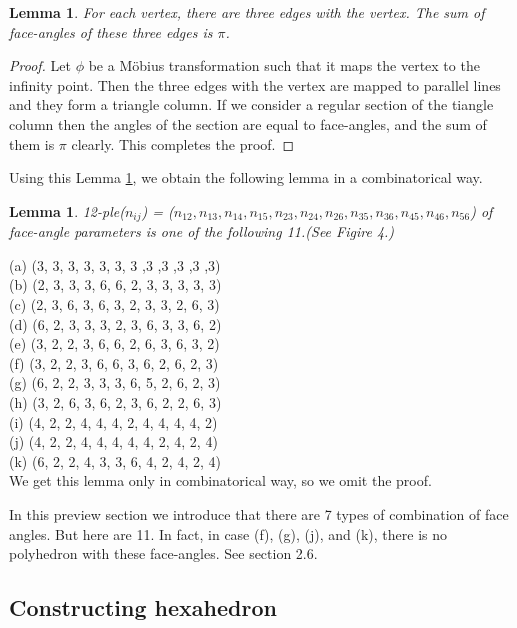 \documentclass[dvipdfmx]{interact}
\theoremstyle{plain}%
\newtheorem{lemma}[theorem]{Lemma}
\theoremstyle{definition}
\theoremstyle{remark}
\theoremstyle{problemstyle}
\begin{document}
\begin{lemma}\label{sum}
 For each vertex, there are three edges with the vertex. The sum of
 face-angles of these three edges is $\pi$.
\end{lemma}

\begin{proof}
 Let $\phi$ be a M\"obius transformation such that it maps the vertex to
 the infinity point. Then the three edges with the vertex are mapped to
 parallel lines and they form a triangle column. If we consider a
 regular section of the tiangle column then the angles of the section
 are equal to face-angles, and the sum of them is $\pi$ clearly. This
 completes the proof.
\end{proof}

 Using this Lemma \ref{sum}, we obtain the following lemma in a combinatorical way.

\begin{lemma}
 12-ple($n_{ij}$) = ($n_{12}, n_{13}, n_{14}, n_{15}, n_{23}, n_{24},
 n_{26}, n_{35}, n_{36}, n_{45}, n_{46}, n_{56}$) of face-angle
 parameters is one of the following 11.(See Figire 4.)
\end{lemma}

\noindent
(a) (3, 3, 3, 3, 3, 3, 3 ,3 ,3 ,3 ,3 ,3)\\
(b) (2, 3, 3, 3, 6, 6, 2, 3, 3, 3, 3, 3)\\
(c) (2, 3, 6, 3, 6, 3, 2, 3, 3, 2, 6, 3)\\
(d) (6, 2, 3, 3, 3, 2, 3, 6, 3, 3, 6, 2)\\
(e) (3, 2, 2, 3, 6, 6, 2, 6, 3, 6, 3, 2)\\
(f) (3, 2, 2, 3, 6, 6, 3, 6, 2, 6, 2, 3)\\
(g) (6, 2, 2, 3, 3, 3, 6, 5, 2, 6, 2, 3)\\
(h) (3, 2, 6, 3, 6, 2, 3, 6, 2, 2, 6, 3)\\
(i) (4, 2, 2, 4, 4, 4, 2, 4, 4, 4, 4, 2)\\
(j) (4, 2, 2, 4, 4, 4, 4, 4, 2, 4, 2, 4)\\
(k) (6, 2, 2, 4, 3, 3, 6, 4, 2, 4, 2, 4)\\


We get this lemma only in combinatorical way, so we omit the proof.

In this preview section we introduce that there are 7 types of
combination of face angles. But here are 11. In fact, in case (f), (g),
(j), and (k), there is no polyhedron with these face-angles. See section 2.6.

\subsection{Constructing hexahedron}
\end{document}

